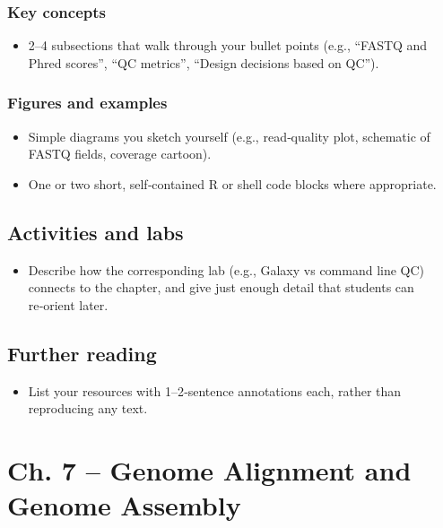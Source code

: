 \documentclass[
  letterpaper,
  DIV=11,
  numbers=noendperiod]{scrreprt}
\providecommand{\tightlist}{%
  \setlength{\itemsep}{0pt}\setlength{\parskip}{0pt}}
\begin{document}
\subsection{Key concepts}\label{key-concepts-2}

\begin{itemize}
\tightlist
\item
  2--4 subsections that walk through your bullet points (e.g., ``FASTQ
  and Phred scores'', ``QC metrics'', ``Design decisions based on QC'').
\end{itemize}

\subsection{Figures and examples}\label{figures-and-examples-2}

\begin{itemize}
\tightlist
\item
  Simple diagrams you sketch yourself (e.g., read‑quality plot,
  schematic of FASTQ fields, coverage cartoon).
\item
  One or two short, self‑contained R or shell code blocks where
  appropriate.
\end{itemize}

\section{Activities and labs}\label{activities-and-labs-2}

\begin{itemize}
\tightlist
\item
  Describe how the corresponding lab (e.g., Galaxy vs command line QC)
  connects to the chapter, and give just enough detail that students can
  re‑orient later.
\end{itemize}

\section{Further reading}\label{further-reading-2}

\begin{itemize}
\tightlist
\item
  List your resources with 1--2‑sentence annotations each, rather than
  reproducing any text.
\end{itemize}


\chapter{Ch. 7 -- Genome Alignment and Genome
Assembly}\label{ch.-7-genome-alignment-and-genome-assembly}
\end{document}
